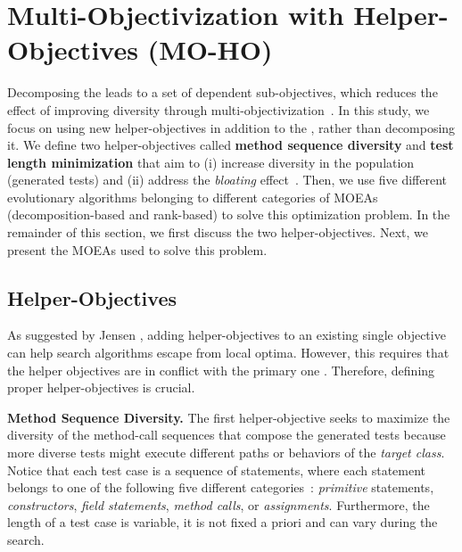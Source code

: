 
\section{Multi-Objectivization with Helper-Objectives (MO-HO)}
\label{section:approach}

Decomposing the \CrashFunction leads to a set of dependent sub-objectives, which reduces the effect of improving diversity through multi-objectivization~\cite{jensen2004helper}. In this study,  we focus on using new helper-objectives in addition to the \CrashFunction, rather than decomposing it. We define two helper-objectives called \textbf{method sequence diversity} and \textbf{test length minimization} that aim to (i) increase diversity in the population (\ie generated tests) and (ii) address the \textit{bloating} effect~\cite{mondal2015, Panichella2018}.
Then, we use five different evolutionary algorithms belonging to different categories of MOEAs (\eg decomposition-based and rank-based) to solve this optimization problem. In the remainder of this section, we first discuss the two helper-objectives. Next, we present the MOEAs used to solve this problem.

\subsection{Helper-Objectives}

As suggested by Jensen \etal \cite{jensen2004helper}, adding helper-objectives to an existing single objective can help search algorithms escape from local optima. However, this requires that the helper objectives are in conflict with the primary one \cite{jensen2004helper}. Therefore, defining proper helper-objectives is crucial. 

\textbf{Method Sequence Diversity.}
%
The first helper-objective seeks to maximize the diversity of the method-call sequences that compose the generated tests because more diverse tests might execute different paths or behaviors of the \textit{target class}. Notice that each test case is a sequence of statements, where each statement belongs to 
one of the following five different categories~\cite{Panichella2018}: \textit{primitive} statements, \textit{constructors}, \textit{field statements}, \textit{method calls}, or \textit{assignments}. Furthermore, the length of a test case is variable, \ie it is not fixed a priori and can vary during the search.

